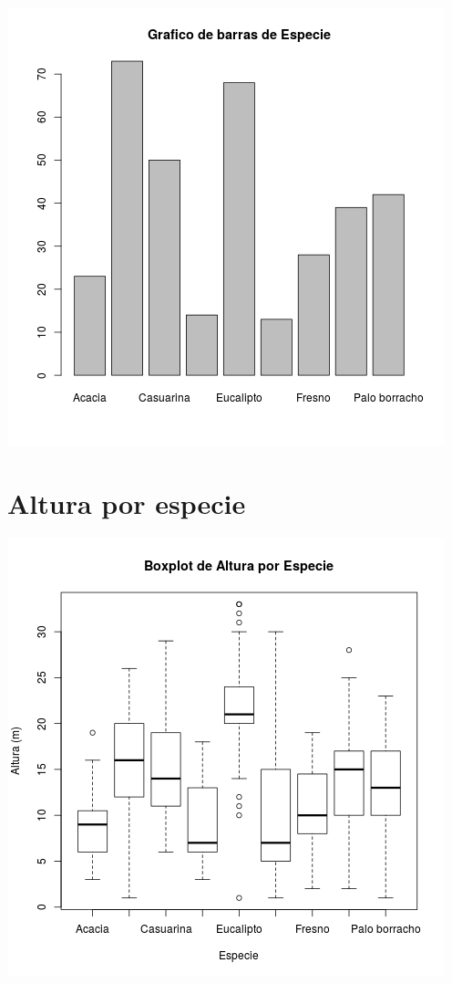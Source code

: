 \documentclass{article}
\begin{document}
\includegraphics[width=\textwidth]{especie_barras.png}

\section{Altura por especie}

\includegraphics[width=\textwidth]{altura_por_especie_boxplot.png}
\end{document}
